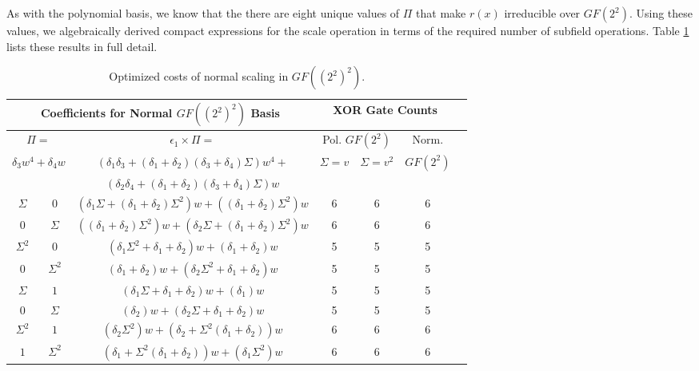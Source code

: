 As with the polynomial basis, we know that the there are eight unique values of $\Pi$ that make $r(x)$ irreducible over $GF(2^2)$. Using these values, we algebraically derived compact expressions for the scale operation in terms of the required number of subfield operations. Table \ref{tab:normalScaleOptimize} lists these results in full detail.

\begin{table}[ht!]
\small
\begin{center}
	\caption{Optimized costs of normal scaling in $GF((2^2)^2)$.}
	\begin{tabular}{|c|c|c|c|c|c|c|} \hline
		\multicolumn{3}{|c|}{Coefficients for Normal $GF((2^2)^2)$ Basis} & \multicolumn{3}{c|}{XOR Gate Counts} \\ \hline
		\multicolumn{2}{|c}{$\Pi = $} & \multicolumn{1}{|c|}{$\epsilon_1 \times \Pi = $} & \multicolumn{2}{|c|}{Pol. $GF(2^2)$} & \multicolumn{1}{c|}{Norm.} \\
		\multicolumn{2}{|c|}{$\delta_3 w^4 + \delta_4 w$} & \multicolumn{1}{c}{$(\delta_1\delta_3 + (\delta_1 + \delta_2)(\delta_3 + \delta_4)\Sigma)w^4 +$} & \multicolumn{1}{|c|}{$\Sigma = v$} & \multicolumn{1}{|c|}{$\Sigma = v^2$} & \multicolumn{1}{|c|}{$GF(2^2)$} \\ 
		\multicolumn{2}{|c|}{} & \multicolumn{1}{c}{$(\delta_2\delta_4 + (\delta_1 + \delta_2)(\delta_3 + \delta_4)\Sigma)w$} & \multicolumn{1}{|c|}{} & \multicolumn{1}{|c|}{} & \multicolumn{1}{|c|}{} \\ \hline

		$\Sigma$ & $0$   & $(\delta_1\Sigma + (\delta_1 + \delta_2)\Sigma^2)w + ((\delta_1 + \delta_2)\Sigma^2)w$ & 6 & 6 & 6 \\ 
		$0$ & $\Sigma$   & $((\delta_1 + \delta_2)\Sigma^2)w + (\delta_2\Sigma + (\delta_1 + \delta_2)\Sigma^2)w$ & 6 & 6 & 6 \\ 
		$\Sigma^2$ & $0$ & $(\delta_1\Sigma^2 + \delta_1 + \delta_2)w + (\delta_1 + \delta_2)w$                   & 5 & 5 & 5 \\ 
		$0$ & $\Sigma^2$ & $(\delta_1 + \delta_2)w + (\delta_2\Sigma^2 + \delta_1 + \delta_2)w$                   & 5 & 5 & 5  \\ 
		$\Sigma$ & $1$   & $(\delta_1\Sigma + \delta_1 + \delta_2)w + (\delta_1)w$                                & 5 & 5 & 5  \\ 
		$0$ & $\Sigma$   & $(\delta_2)w + (\delta_2\Sigma + \delta_1 + \delta_2)w$                                & 5 & 5 & 5  \\ 
		$\Sigma^2$ & $1$ & $(\delta_2\Sigma^2)w + (\delta_2 + \Sigma^2(\delta_1 + \delta_2))w$                    & 6 & 6 & 6  \\ 
		$1$ & $\Sigma^2$ & $(\delta_1 + \Sigma^2(\delta_1 + \delta_2))w + (\delta_1\Sigma^2)w$                    & 6 & 6 & 6  \\ \hline
    \end{tabular}
	\label{tab:normalScaleOptimize}
\end{center}
\end{table}

